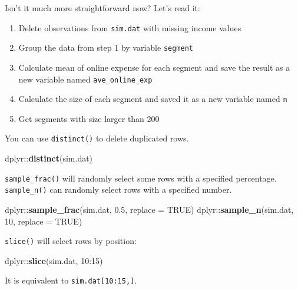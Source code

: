 \documentclass[12pt,]{krantz}
\newenvironment{Shaded}{\begin{snugshade}}{\end{snugshade}}
\newcommand{\KeywordTok}[1]{\textcolor[rgb]{0.13,0.29,0.53}{\textbf{{#1}}}}
\newcommand{\DataTypeTok}[1]{\textcolor[rgb]{0.13,0.29,0.53}{{#1}}}
\newcommand{\DecValTok}[1]{\textcolor[rgb]{0.00,0.00,0.81}{{#1}}}
\newcommand{\FloatTok}[1]{\textcolor[rgb]{0.00,0.00,0.81}{{#1}}}
\newcommand{\OtherTok}[1]{\textcolor[rgb]{0.56,0.35,0.01}{{#1}}}
\newcommand{\NormalTok}[1]{{#1}}
\providecommand{\tightlist}{%
  \setlength{\itemsep}{0pt}\setlength{\parskip}{0pt}}
\theoremstyle{definition}
\theoremstyle{definition}
\theoremstyle{remark}
\begin{document}
Isn't it much more straightforward now? Let's read it:

\begin{enumerate}
\def\labelenumi{\arabic{enumi}.}
\tightlist
\item
  Delete observations from \texttt{sim.dat} with missing income values
\item
  Group the data from step 1 by variable \texttt{segment}
\item
  Calculate mean of online expense for each segment and save the result
  as a new variable named \texttt{ave\_online\_exp}
\item
  Calculate the size of each segment and saved it as a new variable
  named \texttt{n}
\item
  Get segments with size larger than 200
\end{enumerate}

You can use \texttt{distinct()} to delete duplicated rows.

\begin{Shaded}
\begin{Highlighting}[]
\NormalTok{dplyr::}\KeywordTok{distinct}\NormalTok{(sim.dat)}
\end{Highlighting}
\end{Shaded}

\texttt{sample\_frac()} will randomly select some rows with a specified
percentage. \texttt{sample\_n()} can randomly select rows with a
specified number.

\begin{Shaded}
\begin{Highlighting}[]
\NormalTok{dplyr::}\KeywordTok{sample_frac}\NormalTok{(sim.dat, }\FloatTok{0.5}\NormalTok{, }\DataTypeTok{replace =} \OtherTok{TRUE}\NormalTok{) }
\NormalTok{dplyr::}\KeywordTok{sample_n}\NormalTok{(sim.dat, }\DecValTok{10}\NormalTok{, }\DataTypeTok{replace =} \OtherTok{TRUE}\NormalTok{) }
\end{Highlighting}
\end{Shaded}

\texttt{slice()} will select rows by position:

\begin{Shaded}
\begin{Highlighting}[]
\NormalTok{dplyr::}\KeywordTok{slice}\NormalTok{(sim.dat, }\DecValTok{10}\NormalTok{:}\DecValTok{15}\NormalTok{) }
\end{Highlighting}
\end{Shaded}

It is equivalent to \texttt{sim.dat{[}10:15,{]}}.
\end{document}
